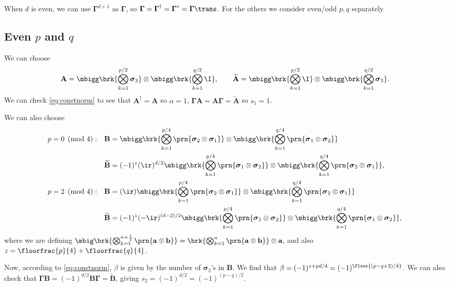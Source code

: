 \documentclass[11pt]{article}
\newcommand{\Gammab}{\boldsymbol{\Gamma}}
\newcommand{\A}{\mathbf{A}}
\newcommand{\B}{\mathbf{B}}
\newcommand{\At}{\widetilde{\A}}
\newcommand{\Bt}{\widetilde{\B}}
\newcommand{\sigmab}{\boldsymbol{\sigma}}
\begin{document}
When $d$ is even, we can use $\Gammab^{d+1}$ as $\Gammab$, so $\Gammab = \Gammab^\dag = \Gammab^\ast =\Gammab\trans$.
For the others we consider even/odd $p,q$ separately.


\subsection{Even \texorpdfstring{$p$ and $q$}{p and q}}\label{sec:eveneven}

We can choose
%
\begin{equation*}
  \A = \mbigg\brk{\bigotimes_{k=1}^{p/2} \sigmab_3}
        \otimes \mbigg\brk{\bigotimes_{k=1}^{q/2} \I},
  \qquad
  \At = \mbigg\brk{\bigotimes_{k=1}^{p/2} \I}
        \otimes \mbigg\brk{\bigotimes_{k=1}^{q/2} \sigmab_3}.
\end{equation*}
%
We can check \cref{eq:constnorm} to see that $\A^\dag = \A$ so $\alpha=1$, $\Gammab \A = \A \Gammab = \At$ so $s_1 = 1$.

We can also choose
%
\begin{equation*}
\begin{aligned}
  p &= 0 \pmod 4: &
  \B &= \mbigg\brk{\bigotimes_{k=1}^{p/4} \prn{\sigmab_2 \otimes \sigmab_1}} \otimes
        \mbigg\brk{\bigotimes_{k=1}^{q/4} \prn{\sigmab_1 \otimes \sigmab_2}} \\ &&
  \Bt &= (-1)^{z} (\ir)^{d/2}
        \mbigg\brk{\bigotimes_{k=1}^{p/4} \prn{\sigmab_1 \otimes \sigmab_2}} \otimes
        \mbigg\brk{\bigotimes_{k=1}^{q/4} \prn{\sigmab_2 \otimes \sigmab_1}},
  \\
  p &= 2 \pmod 4: &
  \B &= (\ir)
        \mbigg\brk{\bigotimes_{k=1}^{p/4} \prn{\sigmab_2 \otimes \sigmab_1}} \otimes
        \mbigg\brk{\bigotimes_{k=1}^{q/4} \prn{\sigmab_2 \otimes \sigmab_1}} \\ &&
  \Bt &= (-1)^{z} (-\ir)^{(d-2)/2}
        \mbigg\brk{\bigotimes_{k=1}^{p/4} \prn{\sigmab_1 \otimes \sigmab_2}} \otimes
        \mbigg\brk{\bigotimes_{k=1}^{q/4} \prn{\sigmab_1 \otimes \sigmab_2}},
\end{aligned}
\end{equation*}
%
where we are defining \( \mbig\brk{\bigotimes_{k=1}^{n+\frac{1}{2}} \prn{\mathbf{a} \otimes \mathbf{b}}}
= \brk{\bigotimes_{k=1}^{n} \prn{\mathbf{a} \otimes \mathbf{b}}} \otimes \mathbf{a} \),
and also $z = \floorfrac{p}{4} + \floorfrac{q}{4}$.

Now, according to \cref{eq:constnorm}, $\beta$ is given by the number of $\sigmab_2$'s in $\B$.
We find that \( \beta = (-1)^{z + pd/4} = (-1)^{\floor{(p-q+2)/4}} \).
We can also check that $\Gammab \B = (-1)^{d/2}\B \Gammab = \Bt$, giving $s_2 = (-1)^{d/2} = (-1)^{(p-q)/2}$.
\end{document}
